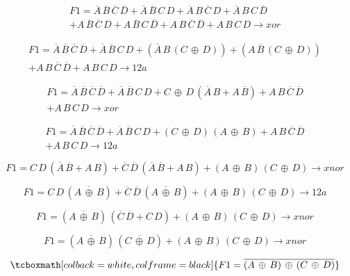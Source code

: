 \documentclass[12pt, oneside, openany]{article}
\begin{document}
{\large
    \newpage
    \begin{multline*}
        F1 = \overline{A}\,\overline{B}\,\overline{C}\,\overline{D} + \overline{A}\,\overline{B}\,C\,D + \overline{A}\,B\,\overline{C}\,D + \overline{A}\,B\,C\,\overline{D} \\
        + A\,\overline{B}\,\overline{C}\,D + A\,\overline{B}\,C\,\overline{D} + A\,B\,\overline{C}\,\overline{D} + A\,B\,C\,D \to xor
    \end{multline*}
    
    \begin{multline*}
        F1 = \overline{A}\,\overline{B}\,\overline{C}\,\overline{D} + \overline{A}\,\overline{B}\,C\,D + (\overline{A}\,B\,(C\,\oplus\,D)) + (A\,\overline{B}\,(C\,\oplus\,D)) \\
        + A\,B\,\overline{C}\,\overline{D} + A\,B\,C\,D \to 12a
    \end{multline*}
    
    \begin{multline*}
        F1 = \overline{A}\,\overline{B}\,\overline{C}\,\overline{D} + \overline{A}\,\overline{B}\,C\,D + C\,\oplus\,D\,(\overline{A}\,B + A\,\overline{B}) + A\,B\,\overline{C}\,\overline{D} \\
        + A\,B\,C\,D \to xor
    \end{multline*}
    
    \begin{multline*}
        F1 = \overline{A}\,\overline{B}\,\overline{C}\,\overline{D} + \overline{A}\,\overline{B}\,C\,D + (C\,\oplus\,D)\,(A\,\oplus\,B) + A\,B\,\overline{C}\,\overline{D} \\
        + A\,B\,C\,D \to 12a
    \end{multline*}
    
    \begin{equation*}
        F1 = C\,D\,(\overline{A}\,\overline{B} + A\,B) + \overline{C}\,\overline{D}\,(\overline{A}\,\overline{B} + A\,B) + (A\,\oplus\,B)\,(C\,\oplus\,D) \to xnor
    \end{equation*}
    
    \begin{equation*}
        F1 = C\,D\,(\overline{A\,\oplus\,B}) + \overline{C}\,\overline{D}\,(\overline{A\,\oplus\,B}) + (A\,\oplus\,B)\,(C\,\oplus\,D) \to 12a
    \end{equation*}
    
    \begin{equation*}
        F1 = (\overline{A\,\oplus\,B})\,(\overline{C}\,\overline{D} + C\,D) + (A\,\oplus\,B)\,(C\,\oplus\,D) \to xnor
    \end{equation*}
    
    \begin{equation*}
        F1 = (\overline{A\,\oplus\,B})\,(\overline{C\,\oplus\,D}) + (A\,\oplus\,B)\,(C\,\oplus\,D) \to xnor
    \end{equation*}
    
    \begin{equation*}
        \tcboxmath[colback=white, colframe=black]{
            F1 = \overline{(A\,\oplus\,B)\,\oplus\,(C\,\oplus\,D)}
        }
    \end{equation*}
    
}
\end{document}
